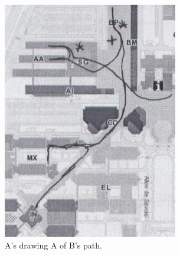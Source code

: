 \documentclass[twocolumn]{article}
\begin{document}
\begin{figure}[h!t]
        \centering
        \begin{subfigure}{.3\textwidth}
            \includegraphics[width=\linewidth]{image6.png}
            \caption{A's drawing A of B's path.}
        \end{subfigure}
        \begin{subfigure}{.3\textwidth}

\end{subfigure}
\end{figure}
\end{document}
